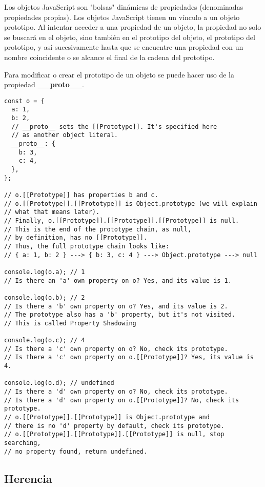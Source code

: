 \documentclass{article}
\begin{document}
Los objetos JavaScript son "bolsas" dinámicas de propiedades (denominadas propiedades propias). Los objetos JavaScript tienen un vínculo a un objeto prototipo.
Al intentar acceder a una propiedad de un objeto, la propiedad no solo se buscará en el objeto, sino también en el prototipo del objeto, el prototipo del prototipo,
y así sucesivamente hasta que se encuentre una propiedad con un nombre coincidente o se alcance el final de la cadena del prototipo.

Para modificar o crear el prototipo de un objeto se puede hacer uso de la propiedad \textbf{\_\_proto\_\_}.

\begin{lstlisting}
const o = {
  a: 1,
  b: 2,
  // __proto__ sets the [[Prototype]]. It's specified here
  // as another object literal.
  __proto__: {
    b: 3,
    c: 4,
  },
};

// o.[[Prototype]] has properties b and c.
// o.[[Prototype]].[[Prototype]] is Object.prototype (we will explain
// what that means later).
// Finally, o.[[Prototype]].[[Prototype]].[[Prototype]] is null.
// This is the end of the prototype chain, as null,
// by definition, has no [[Prototype]].
// Thus, the full prototype chain looks like:
// { a: 1, b: 2 } ---> { b: 3, c: 4 } ---> Object.prototype ---> null

console.log(o.a); // 1
// Is there an 'a' own property on o? Yes, and its value is 1.

console.log(o.b); // 2
// Is there a 'b' own property on o? Yes, and its value is 2.
// The prototype also has a 'b' property, but it's not visited.
// This is called Property Shadowing

console.log(o.c); // 4
// Is there a 'c' own property on o? No, check its prototype.
// Is there a 'c' own property on o.[[Prototype]]? Yes, its value is 4.

console.log(o.d); // undefined
// Is there a 'd' own property on o? No, check its prototype.
// Is there a 'd' own property on o.[[Prototype]]? No, check its prototype.
// o.[[Prototype]].[[Prototype]] is Object.prototype and
// there is no 'd' property by default, check its prototype.
// o.[[Prototype]].[[Prototype]].[[Prototype]] is null, stop searching,
// no property found, return undefined.

\end{lstlisting}

\subsection{Herencia}
\end{document}
